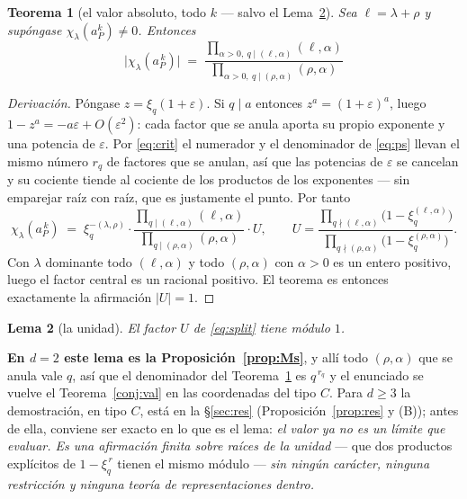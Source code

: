 \documentclass[11pt,a4paper]{article}
\newtheorem{theorem}{Teorema}[section]
\newtheorem{lemma}[theorem]{Lema}
\begin{document}
\begin{theorem}[el valor absoluto, todo $k$ --- salvo el Lema~\ref{lem:unit}]\label{thm:valgen}
Sea $\ell=\lambda+\rho$ y supóngase $\chi_\lambda(a_P^k)\neq0$. Entonces
\[
\boxed{\;\bigl|\chi_\lambda(a_P^{\,k})\bigr|\;=\;
\frac{\prod_{\alpha>0,\ q\mid(\ell,\alpha)}(\ell,\alpha)}
     {\prod_{\alpha>0,\ q\mid(\rho,\alpha)}(\rho,\alpha)}\;}
\]
\end{theorem}

\begin{proof}[Derivación]
Póngase $z=\xi_q(1+\varepsilon)$. Si $q\mid a$ entonces $z^a=(1+\varepsilon)^a$, luego
$1-z^a=-a\varepsilon+O(\varepsilon^2)$: cada factor que se anula aporta su propio exponente y una
potencia de $\varepsilon$. Por \eqref{eq:crit} el numerador y el denominador de \eqref{eq:ps} llevan
el mismo número $r_q$ de factores que se anulan, así que las potencias de $\varepsilon$ se cancelan y
su cociente tiende al cociente de los productos de los exponentes --- sin emparejar raíz con raíz,
que es justamente el punto. Por tanto
\begin{equation}\label{eq:split}
\chi_\lambda(a_P^{\,k})\;=\;\xi_q^{-(\lambda,\rho)}\cdot
\frac{\prod_{q\mid(\ell,\alpha)}(\ell,\alpha)}{\prod_{q\mid(\rho,\alpha)}(\rho,\alpha)}\cdot U,
\qquad
U=\frac{\prod_{q\nmid(\ell,\alpha)}\bigl(1-\xi_q^{(\ell,\alpha)}\bigr)}
        {\prod_{q\nmid(\rho,\alpha)}\bigl(1-\xi_q^{(\rho,\alpha)}\bigr)} .
\end{equation}
Con $\lambda$ dominante todo $(\ell,\alpha)$ y todo $(\rho,\alpha)$ con $\alpha>0$ es un entero
positivo, luego el factor central es un racional positivo. El teorema es entonces exactamente la
afirmación $|U|=1$.
\end{proof}

\begin{lemma}[la unidad]\label{lem:unit}
El factor $U$ de \eqref{eq:split} tiene módulo $1$.
\end{lemma}

\noindent \textbf{En $d=2$ este lema es la Proposición~\ref{prop:Ms}}, y allí todo $(\rho,\alpha)$
que se anula vale $q$, así que el denominador del Teorema~\ref{thm:valgen} es $q^{\,r_q}$ y el
enunciado se vuelve el Teorema~\ref{conj:val} en las coordenadas del tipo $C$. Para $d\ge3$ la demostración,
en tipo $C$, está en la \S\ref{sec:res} (Proposición~\ref{prop:res} y (B)); antes de ella, conviene
ser exacto en lo que es el lema: \emph{el valor ya no es un límite que evaluar. Es
una afirmación finita sobre raíces de la unidad} --- que dos productos explícitos de
$1-\xi_q^{\,r}$ tienen el mismo módulo --- \emph{sin ningún carácter, ninguna restricción y ninguna
teoría de representaciones dentro.}
\end{document}
